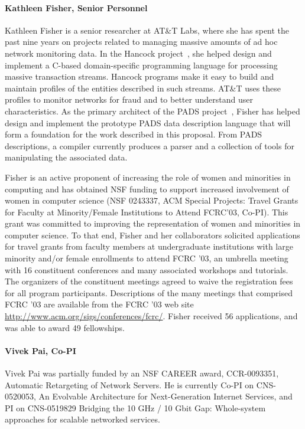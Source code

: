 \documentclass[10pt]{article}
\begin{document}
\paragraph*{Kathleen Fisher, Senior Personnel} 
Kathleen Fisher is a senior researcher at AT\&T Labs,
where she has spent the past nine years on projects
related to managing massive amounts of ad hoc network monitoring data.
In the Hancock project~\cite{kdd00,hancock-toplas}, she helped 
design and implement a C-based
domain-specific programming language for processing massive  
transaction streams.  Hancock programs make it easy to build
and maintain profiles of the entities described in such streams. 
AT\&T uses these profiles to monitor networks for fraud 
and to better understand user characteristics.
As the primary architect of the PADS project~\cite{fisher+:pads}, 
Fisher has helped design and implement the prototype PADS
data description language that will form a foundation for the work
described in this proposal.  From PADS descriptions,
a compiler currently produces a parser and a collection of tools for
manipulating the associated data.  

Fisher is an active proponent of increasing the role of women and
minorities in computing and has obtained NSF funding to support
increased involvement of women in computer science (NSF 0243337, ACM
Special Projects: Travel Grants for Faculty at Minority/Female
Institutions to Attend FCRC'03, Co-PI).  This grant was committed to
improving the representation of women and minorities in computer
science. To that end, Fisher and her collaborators 
solicited applications for travel grants from
faculty members at undergraduate institutions with large minority
and/or female enrollments to attend FCRC '03, an umbrella meeting with
16 constituent conferences and many associated workshops and
tutorials.  The organizers of the constituent meetings agreed to waive
the registration fees for all program participants.  Descriptions of
the many meetings that comprised FCRC '03 are available from the FCRC
'03 web site \url{http://www.acm.org/sigs/conferences/fcrc/}.  Fisher
received 56 applications, and was able to award 49 fellowships.

\paragraph*{Vivek Pai, Co-PI} Vivek Pai was partially funded by 
an NSF CAREER award, CCR-0093351, Automatic Retargeting of Network
Servers. He is currently Co-PI on CNS-0520053, An Evolvable
Architecture for Next-Generation Internet Services, and PI on
CNS-0519829 Bridging the 10 GHz / 10 Gbit Gap: Whole-system approaches
for scalable networked services.
\end{document}
